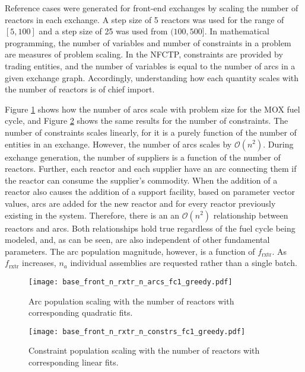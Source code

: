 Reference cases were generated for front-end exchanges by scaling the number of
reactors in each exchange. A step size of 5 reactors was used for the range of
$[5, 100]$ and a step size of 25 was used from $(100, 500]$. In mathematical
  programming, the number of variables and number of constraints in a problem
  are measures of problem scaling. In the NFCTP, constraints are provided by
  trading entities, and the number of variables is equal to the number of arcs
  in a given exchange graph. Accordingly, understanding how each quantity scales
  with the number of reactors is of chief import.

Figure \ref{fig:base_front_n_rxtr_n_arcs_fc1_greedy} shows how the number of
arcs scale with problem size for the MOX fuel cycle, and Figure
\ref{fig:base_front_n_rxtr_n_constrs_fc1_greedy} shows the same results for the
number of constraints. The number of constraints scales linearly, for it is a
purely function of the number of entities in an exchange. However, the number of
arcs scales by $\mathcal{O}(n^2)$. During exchange generation, the number of
suppliers is a function of the number of reactors. Further, each reactor and
each supplier have an arc connecting them if the reactor can consume the
supplier's commodity. When the addition of a reactor also causes the addition of
a support facility, based on parameter vector values, arcs are added for the new
reactor and for every reactor previously existing in the system. Therefore,
there is an an $\mathcal{O}(n^2)$ relationship between reactors and arcs. Both
relationships hold true regardless of the fuel cycle being modeled, and, as can
be seen, are also independent of other fundamental parameters. The arc
population magnitude, however, is a function of $f_\text{rxtr}$. As
$f_\text{rxtr}$ increases, $n_a$ individual assemblies are requested rather than
a single batch.

\begin{figure}[h!]
  \begin{center}
    \texttt{[image: base\_front\_n\_rxtr\_n\_arcs\_fc1\_greedy.pdf]}
    \caption{
      \label{fig:base_front_n_rxtr_n_arcs_fc1_greedy}
      Arc population scaling with the number of reactors with corresponding
      quadratic fits.}
  \end{center}
\end{figure}

\begin{figure}[h!]
  \begin{center}
    \texttt{[image: base\_front\_n\_rxtr\_n\_constrs\_fc1\_greedy.pdf]}
    \caption{
      \label{fig:base_front_n_rxtr_n_constrs_fc1_greedy}
      Constraint population scaling with the number of reactors with
      corresponding linear fits.}
  \end{center}
\end{figure}

